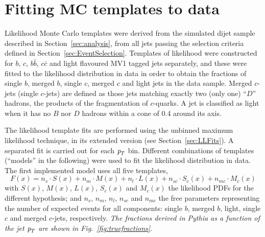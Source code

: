 


\section{Fitting MC templates to data}\label{sec:FitsResults}



Likelihood Monte Carlo templates were derived from the simulated dijet sample described in Section~\ref{sec:analysis}, from all jets passing the selection criteria defined in Section~\ref{sec:EventSelection}. Templates of likelihood were constructed for $b$, $c$, $b\bar{b}$, $c\bar{c}$ and light flavoured MV1 tagged jets separately, and these were fitted to the likelihood distribution in data in order to obtain the fractions of single $b$, merged $b$, single $c$, merged $c$ and light jets in the data sample. Merged $c$-jets (single $c$-jets) are defined as those jets matching exactly two (only one) ``$D$'' hadrons, the products of the fragmentation of $c$-quarks. A jet is classified as light when it has no $B$ nor $D$ hadrons within a cone of 0.4 around its axis.

The likelihood template fits are performed using the unbinned maximum likelihood technique, in its extended version (see Section~\ref{sec:LLFits}). A separated fit is carried out for each ${\emph{p}_{T}}$ bin. Different combinations of templates (``models'' in the following) were used to fit the likelihood distribution in data. The first implemented model uses all five templates,
%
\begin{equation}
F(x) = n_s \cdot S(x) + n_m \cdot M(x) + n_l \cdot L(x) + n_{sc} \cdot S_c(x) + n_{mc} \cdot M_c(x)
\end{equation}
%
with $S(x)$, $M(x)$, $L(x)$, $S_c(x)$ and $M_c(x)$ the likelihood PDFs for the different hypothesis; and $n_s$, $n_m$, $n_l$, $n_{sc}$ and $n_{mc}$ the free parameters representing the number of expected events for all components: single $b$, merged $b$, light, single $c$ and merged $c$-jets, respectively.  %
\emph{The fractions derived in {\sc Pythia}  as a function of the jet ${\emph{p}_{T}}$ are shown in Fig.~\ref{fig:truefractions}.}



